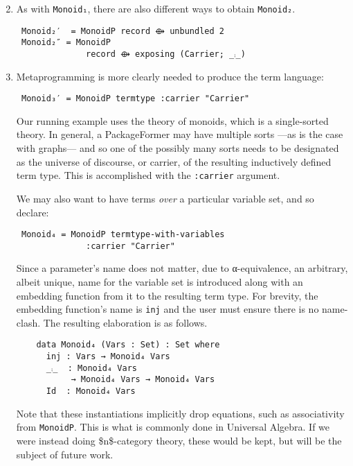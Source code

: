 \documentclass[sigplan,screen]{acmart}
\begin{document}
\begin{enumerate}
\setcounter{enumi}{1}
\item As with \texttt{Monoid₁}, there are also different ways
to obtain \texttt{Monoid₂}.
   \vspace{0.3em}
\begin{verbatim}
 Monoid₂′  = MonoidP record ⟴ unbundled 2
 Monoid₂″ = MonoidP
              record ⟴ exposing (Carrier; _⨾_)
\end{verbatim}

\vspace{0.3em}
\end{enumerate}

\begin{enumerate}
\setcounter{enumi}{2}
\item Metaprogramming is more clearly needed to produce the term language:
\vspace{0.3em}
\begin{verbatim}
 Monoid₃′ = MonoidP termtype :carrier "Carrier"
\end{verbatim}
 \vspace{0.3em}
\noindent
Our running example uses the theory of monoids, which is a single-sorted theory.
In general, a PackageFormer may have multiple sorts ---as is the case with
graphs--- and so one of the possibly many sorts needs to be designated as the
universe of discourse, or carrier, of the resulting inductively defined term type.
This is accomplished with the \texttt{:carrier} argument.

\vspace{0.3em}
\noindent
We may also want to have terms \emph{over} a particular variable set, and so declare:
\vspace{0.3em}
\begin{verbatim}
 Monoid₄ = MonoidP termtype-with-variables
              :carrier "Carrier"
\end{verbatim}
\vspace{0.3em}
\noindent
Since a parameter's name does not matter, due to α-equivalence, an arbitrary,
albeit unique, name for the variable set is introduced along with an embedding
function from it to the resulting term type. For brevity, the embedding function's
name is \texttt{inj} and the user must ensure there is no name-clash.
The resulting elaboration is as follows.
   \vspace{0.3em}
   \noindent
\begin{verbatim}
    data Monoid₄ (Vars : Set) : Set where
      inj : Vars → Monoid₄ Vars
      _⨾_  : Monoid₄ Vars
           → Monoid₄ Vars → Monoid₄ Vars
      Id  : Monoid₄ Vars
\end{verbatim}

\vspace{0.3em}
\noindent
Note that these instantiations implicitly drop equations, such
as associativity from \texttt{MonoidP}.  This is what is commonly done
in Universal Algebra. If we were instead doing \$n\$-category
theory, these would be kept, but will be the subject of future
work.
\end{enumerate}
\end{document}
